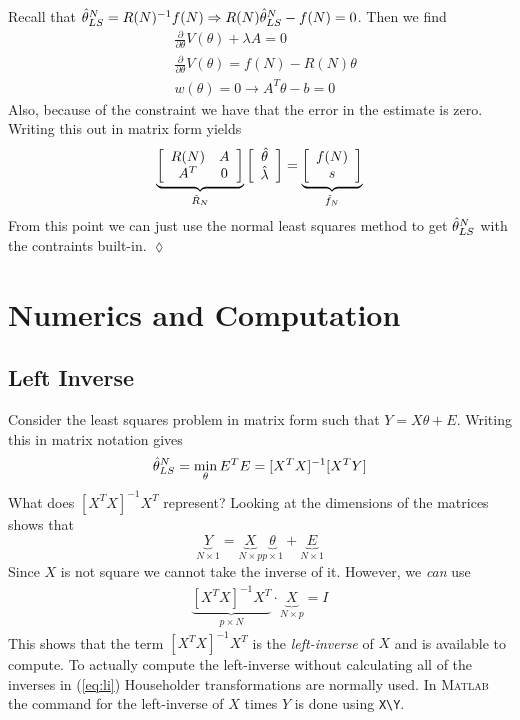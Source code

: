 \documentclass[lecture,12pt,]{pcms-l}
\begin{document}
\begin{example}
\begin{align*}
\begin{split}
\end{split}
\end{align*}
Recall that $\hat{\theta}_{LS}^N=R(N)^{-1}f(N)\Rightarrow R(N)\hat{\theta}_{LS}^N-f(N)=0$. Then we find
\begin{align*}
&\frac{\partial}{\partial\theta}V(\theta) +\lambda A = 0 \\
&\frac{\partial}{\partial\theta}V(\theta) = f(N)-R(N)\theta \\
&w(\theta)=0\rightarrow A^T\theta-b=0
\end{align*}
Also, because of the constraint we have that the error in the estimate is zero. Writing this out in matrix form yields
\begin{align*}
\underbrace{\left[\begin{array}{c c} R(N) & A \\ A^T & 0 \end{array}\right]}_{\tilde{R}_N} \left[\begin{array}{c} \hat{\theta} \\ \hat{\lambda} \end{array}\right] = \underbrace{\left[\begin{array}{c} f(N) \\ s \end{array}\right]}_{\tilde{f}_N}
\end{align*}
From this point we can just use the normal least squares method to get $\hat{\theta}_{LS}^N$ with the contraints built-in.
$\lozenge$
\end{example}

\section{Numerics and Computation}
\subsection{Left Inverse}
Consider the least squares problem in matrix form such that $Y=X\theta+E$. Writing this in matrix notation gives
$$\hat{\theta}_{LS}^N = \min_\theta E^TE = [X^TX]^{-1}[X^TY]$$
What does $[X^TX]^{-1}X^T$ represent? Looking at the dimensions of the matrices shows that
$$\underbrace{Y}_{N\times1} = \underbrace{X}_{N\times p} \underbrace{\theta}_{p\times1} + \underbrace{E}_{N\times1}$$
Since $X$ is not square we cannot take the inverse of it. However, we \textit{can} use
\begin{align}
\label{eq:li}
\underbrace{[X^TX]^{-1}X^T}_{p\times N} \cdot \underbrace{X}_{N\times p} = I
\end{align}
This shows that the term $[X^TX]^{-1}X^T$ is the \textit{left-inverse} of $X$ and is available to compute. To actually compute the left-inverse without calculating all of the inverses in (\ref{eq:li}) Householder transformations are normally used. In \textsc{Matlab} the command for the left-inverse of $X$ times $Y$ is done using \texttt{X\textbackslash Y}.
\end{document}
